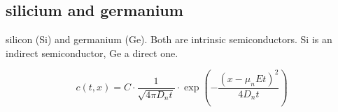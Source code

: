 \subsection{silicium and germanium}
silicon (Si) and germanium (Ge). 
Both are intrinsic semiconductors. 
Si is an indirect semiconductor, Ge a direct one. 


\begin{equation}
    c(t, x) = C \cdot \frac{1}{\sqrt{4 \pi D_n t}} 
    \cdot \exp\left( -\frac{\left( x - \mu_n E t \right)^2}{4 D_n t} \right)
    \label{eq:c_t_x}
\end{equation}

